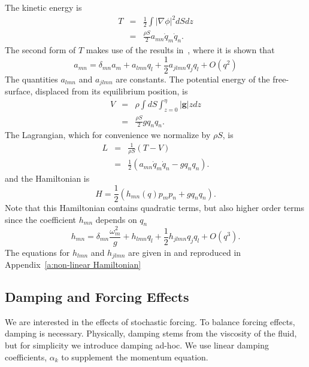 The kinetic energy is
\begin{eqnarray*}
T & = & \frac12 \int | \nabla \phi |^2 dS dz\\
& = & \frac{\rho S}{2} a_{mn} \dot{q}_m \dot{q}_n .
\end{eqnarray*}
The second form of $T$ makes use of the results in~\citet{miles76:_nonlin}, where it is shown that
\begin{equation}
a_{mn} = \delta_{mn} a_m + a_{lmn} q_l + \frac12 a_{jlmn} q_j q_l + O ( q^2 )
\end{equation}
The quantities $a_{lmn}$ and $a_{jlmn}$ are constants. The potential energy of the free-surface, displaced from its equilibrium position, is
\begin{eqnarray}
V &=& \rho \int dS \int^{\eta}_{z = 0} |\boldsymbol{g}| z dz \label{e:potential energy}\\
&=& \frac{\rho S}{2} g q_n q_n. \nonumber
\end{eqnarray}
The Lagrangian, which for convenience we normalize by $\rho S$, is
\begin{eqnarray*}
L &=& \frac{1}{\rho S} ( T - V )\\
& = & \frac12 ( a_{mn} \dot{q}_m \dot{q}_n - g q_n q_n ) .
\end{eqnarray*}
and the Hamiltonian is
\begin{equation}
\label{e:Hamiltonian}
H = \frac12 (h_{mn}(q) p_m p_n + g q_n q_n).
\end{equation}
Note that this Hamiltonian contains quadratic terms, but also higher order terms since the coefficient $h_{mn}$ depends on $q_n$
\begin{equation}
\label{e:hamiltonian coefficient expansion}
h_{mn} = \delta_{mn} \frac{\omega_m^2}{g} + h_{lmn} q_l + \frac12 h_{jlmn} q_j q_l + O(q^3).
\end{equation}
The equations for $h_{lmn}$ and $h_{jlmn}$ are given in \citet{miles76:_nonlin} and reproduced in Appendix~\ref{a:non-linear Hamiltonian}

\subsection{Damping and Forcing Effects}
\label{s:damping}

We are interested in the effects of stochastic forcing. To balance forcing effects, damping is necessary. Physically, damping stems from the viscosity of the fluid, but for simplicity we introduce damping ad-hoc. We use linear damping coefficients, $\alpha_k$ to supplement the momentum equation.

